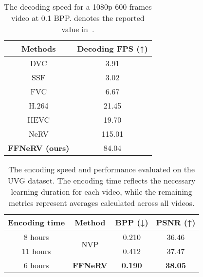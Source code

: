\documentclass[sigconf]{acmart}
\begin{document}
\begin{table}[]
\centering
\caption{The decoding speed for a 1080p 600 frames video at 0.1 BPP.  denotes the reported value in~\cite{fvc_adv}.}
\vskip 0.15in
\begin{tabular}{c|c}\hline
Methods & Decoding FPS (↑) \\\hline\hline
DVC \cite{dvc}     & 3.91             \\
SSF \cite{ssf}    & 3.02         \\
FVC \cite{fvc}    & 6.67         \\\hline
H.264 \cite{h264}   & 21.45             \\
HEVC \cite{hevc}   & 19.70             \\\hline
NeRV \cite{nerv}    & 115.01             \\
\textbf{FFNeRV (ours)}  & 84.04             \\\hline
\end{tabular}
\label{tab:dec}
\end{table}


\begin{table}[]
\centering
\caption{The encoding speed and performance evaluated on the UVG dataset. The encoding time reflects the necessary learning duration for each video, while the remaining metrics represent averages calculated across all videos.}
\begin{tabular}{c|c||cc}
\hline
Encoding time  & Method               & BPP (↓) & PSNR (↑) \\ \hline\hline
8 hours       & \multirow{2}{*}{NVP} & 0.210   & 36.46    \\
11 hours &                      & 0.412   & 37.47    \\ \hline
6 hours  & \textbf{FFNeRV}               & \textbf{0.190}   & \textbf{38.05}    \\ \hline
\end{tabular}
\label{tab:enc}
\end{table}
\end{document}
